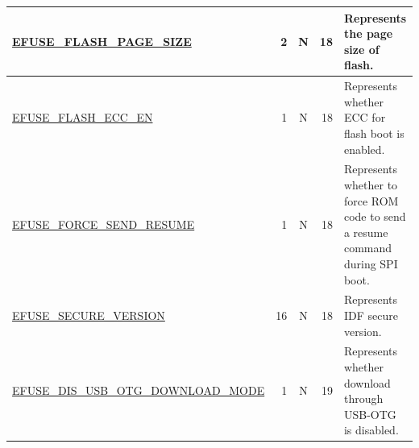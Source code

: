 \begin{longtable}[l]{ |m{8.2cm}|r|c|r|m{9cm}| }
    \hline
    \hyperref[fielddesc:EFUSEFLASHPAGESIZE]{EFUSE\_FLASH\_PAGE\_SIZE} & 2 & N & 18 & Represents the page size of flash.\\
    \hline
    \hyperref[fielddesc:EFUSEFLASHECCEN]{EFUSE\_FLASH\_ECC\_EN} & 1 & N & 18 & Represents whether ECC for flash boot is enabled. \\
    \hline
    \hyperref[fielddesc:EFUSEFORCESENDRESUME]{EFUSE\_FORCE\_SEND\_RESUME} & 1 & N & 18 & Represents whether to force ROM code to send a resume command during SPI boot. \\  
    \hline
    \hyperref[fielddesc:EFUSESECUREVERSION]{EFUSE\_SECURE\_VERSION} & 16 & N & 18 & Represents IDF secure version. \\\hline
    \hyperref[fielddesc:EFUSEDISUSBOTGDOWNLOADMODE]{EFUSE\_DIS\_USB\_OTG\_DOWNLOAD\_MODE} & 1 & N & 19 & Represents whether download through USB-OTG is disabled. \\\hline
\end{longtable}
